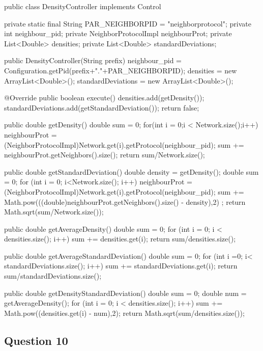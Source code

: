 \documentclass[10pt]{report}
\begin{document}
\begin{boxedlisting}
public class DensityController implements Control{
	private static final String PAR_NEIGHBORPID = "neighborprotocol";
	private int neighbour_pid;
	private NeighborProtocolImpl neighbourProt;
	private List<Double> densities;
	private List<Double> standardDeviations;
	
	public DensityController(String prefix) {
		neighbour_pid = Configuration.getPid(prefix+"."+PAR_NEIGHBORPID);
		densities = new ArrayList<Double>();
		standardDeviations  = new ArrayList<Double>();
	}

	@Override
	public boolean execute() {
		densities.add(getDensity());
		standardDeviations.add(getStandardDeviation());
		return false;
	}

	public double getDensity() {
		double sum = 0;
		for(int i = 0;i < Network.size();i++) {
			neighbourProt = (NeighborProtocolImpl)Network.get(i).getProtocol(neighbour_pid);
			sum += neighbourProt.getNeighbors().size();
		}
		return sum/Network.size();
	}
	
	public double getStandardDeviation() {
		double density = getDensity();
		double sum = 0;
		for (int i = 0; i<Network.size(); i++) {
			neighbourProt = (NeighborProtocolImpl)Network.get(i).getProtocol(neighbour_pid);
			 sum += Math.pow(((double)neighbourProt.getNeighbors().size() - density),2) ;
		}
		return Math.sqrt(sum/Network.size());
	}
	
	public double getAverageDensity() {
		double sum = 0;
		for (int i = 0; i < densities.size(); i++) { 
        	sum += densities.get(i);
            }
		return sum/densities.size();
	}
	
	public double getAverageStandardDeviation() {
		double sum = 0;
		for (int i =0; i< standardDeviations.size(); i++) { 
        	sum += standardDeviations.get(i);
        }
		return sum/standardDeviations.size();
	}
	
	public double getDensityStandardDeviation() {
		double sum = 0;
		double num = getAverageDensity();
		for (int i = 0; i < densities.size(); i++) {
			sum += Math.pow((densities.get(i) - num),2);
		}
		return Math.sqrt(sum/densities.size());
	}	
}
\end{boxedlisting}

\subsection{Question 10}
\end{document}

